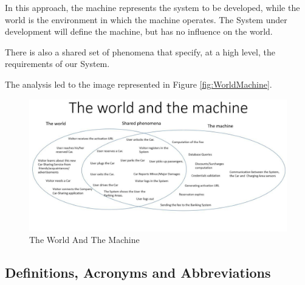 In this approach, the machine represents the system to be developed, while the world is the environment in which the machine operates.
The System under development will define the machine, but has no influence on the world.

There is also a shared set of phenomena that specify, at a high level, the requirements of our System.

The analysis led to the image represented in Figure \ref{fig:WorldMachine}.
\begin{figure}[!htbp]
\centering
\includegraphics[width=\linewidth,keepaspectratio]{../The_world_and_the_machine.jpg}
\caption{The World And The Machine}
\end{figure}
\label{fig:WorldMachine}
\FloatBarrier

\subsection{Definitions, Acronyms and Abbreviations}
